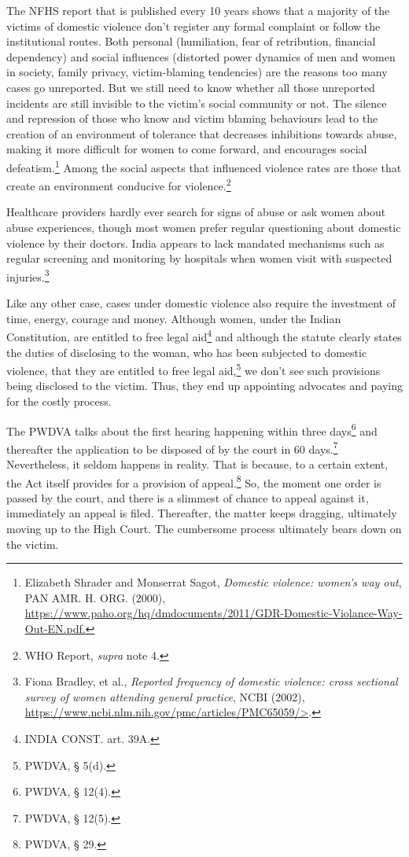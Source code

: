 \begin{multicols}{2}

\noi
The NFHS report that is published every 10 years shows that a majority of the victims of
domestic violence don’t register any formal complaint or follow the institutional routes. Both
personal (humiliation, fear of retribution, financial dependency) and social influences
(distorted power dynamics of men and women in society, family privacy, victim-blaming
tendencies) are the reasons too many cases go unreported. But we still need to know whether
all those unreported incidents are still invisible to the victim's social community or not. The
silence and repression of those who know and victim blaming behaviours lead to the creation
of an environment of tolerance that decreases inhibitions towards abuse, making it more
difficult for women to come forward, and encourages social defeatism.\footnote{Elizabeth Shrader and Monserrat Sagot, \textit{Domestic violence: women’s way out}, PAN AMR. H. ORG. (2000),
\url{https://www.paho.org/hq/dmdocuments/2011/GDR-Domestic-Violance-Way-Out-EN.pdf.}} Among the social
aspects that influenced violence rates are those that create an environment conducive for
violence.\footnote{WHO Report, \textit{supra} note 4.}

\noi
Healthcare providers hardly ever search for signs of abuse or ask women about abuse
experiences, though most women prefer regular questioning about domestic violence by their
doctors. India appears to lack mandated mechanisms such as regular screening and
monitoring by hospitals when women visit with suspected injuries.\footnote{Fiona Bradley, et al., \textit{Reported frequency of domestic violence: cross sectional survey of women attending
general practice}, NCBI (2002), \url{https://www.ncbi.nlm.nih.gov/pmc/articles/PMC65059/>}.}


\noi
Like any other case, cases under domestic violence also require the investment of time,
energy, courage and money. Although women, under the Indian Constitution, are entitled to
free legal aid\footnote{INDIA CONST. art. 39A. } and although the statute clearly states the duties of disclosing to the woman, who has been subjected to domestic violence, that they are entitled to free legal aid,\footnote{ PWDVA, § 5(d).} we
don’t see such provisions being disclosed to the victim. Thus, they end up appointing
advocates and paying for the costly process. 

\noi
The PWDVA talks about the first hearing happening within three days\footnote{PWDVA, § 12(4).} and thereafter the
application to be disposed of by the court in 60 days.\footnote{PWDVA, § 12(5).} Nevertheless, it seldom happens in
reality. That is because, to a certain extent, the Act itself provides for a provision of appeal.\footnote{PWDVA, § 29.}
So, the moment one order is passed by the court, and there is a slimmest of chance to appeal
against it, immediately an appeal is filed. Thereafter, the matter keeps dragging, ultimately
moving up to the High Court. The cumbersome process ultimately bears down on the victim.


\end{multicols}
